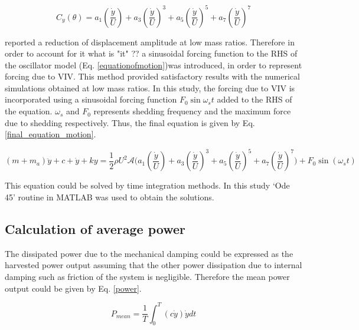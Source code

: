  
\begin{equation}
\label{cy ploynomial}
C_y(\theta)=a_1\left(\frac{\dot{y}}{U}\right)+a_3\left(\frac{\dot{y}}{U}\right)^3+a_5\left(\frac{\dot{y}}{U}\right)^5+a_7\left(\frac{\dot{y}}{U}\right)^7
\end{equation}


\cite{Joly2012} reported a reduction of displacement amplitude at low mass ratios. Therefore in order to account for it {\Tan what is "it" ??} a sinusoidal forcing function to the RHS of the oscillator model (Eq. \eqref{equationofmotion})was introduced, in order to represent forcing due to VIV. This method provided satisfactory results with the numerical simulations obtained at low mass ratios. In this study, the forcing due to VIV is incorporated using a sinusoidal forcing function $F_0\sin{\omega_{s}t}$ added to the RHS of the equation. $\omega_{s}$ and $F_0$ represents shedding frequency and the maximum force due to shedding respectively. Thus, the final equation is given by Eq. \eqref{final_equation_motion}.    

\begin{equation}
\label{final_equation_motion}
(m{+}m_a)\ddot{y}{+}c{+}\dot{y}{+}ky{=}\frac{1}{2}\rho U^2 \mathcal  {A} \Bigg(a_1\left(\frac{\dot{y}}{U}\right){+}a_3\left(\frac{\dot{y}}{U}\right)^3{+}a_5\left(\frac{\dot{y}}{U}\right)^5{+}a_7\left(\frac{\dot{y}}{U}\right)^7 \Bigg){+} F_0\sin{(\omega_s t)}
\end{equation}

This equation could be solved by time integration methods. In  this study  `Ode 45' routine in MATLAB was used to obtain the solutions.

\subsection{Calculation of average power}

 The dissipated power due to the mechanical damping could be expressed as the harvested power output assuming that the other  power dissipation due to internal damping such as friction of the system is negligible. Therefore the mean power output could be given by Eq. \eqref{power}. 
  
 
 \begin{equation}
 \label{power}
P_{mean}=\frac{1}{T}\int_{0}^{T}(c\dot{y})\dot{y} dt
 \end{equation}
 
